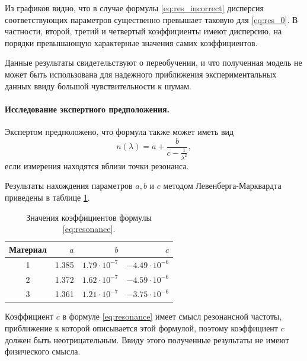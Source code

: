 \documentclass[12pt,a4paper]{article}
\theoremstyle{definition}
\begin{document}
Из графиков видно, что в случае формулы \eqref{eq:res_incorrect} дисперсия соответствующих
параметров существенно превышает таковую для \eqref{eq:res_0}. В частности, второй, третий
и четвертый коэффициенты имеют дисперсию, на порядки превышающую характерные значения самих
коэффициентов.

Данные результаты свидетельствуют о переобучении, и что полученная модель не может быть
использована для надежного приближения экспериментальных данных ввиду большой чувствительности
к шумам.

\paragraph{Исследование экспертного предположения.}

Экспертом предположено, что формула также может иметь вид
\begin{equation}
  n(\lambda) = a + \frac{b}{c - \frac{1}{\lambda^2}},
  \label{eq:resonance}
\end{equation}
если измерения находятся вблизи точки резонанса.

Результаты нахождения параметров $a, b$ и $c$ методом Левенберга-Марквардта
приведены в таблице \ref{tabl:resonance_coeffs}.

\begin{table}[h]
  \centering
  \begin{tabular}{| c | r | r | r |} \hline
	Материал	& $a$		& $b$					& $c$					\\ \hline
	1			& 1.385		& $1.79 \cdot 10^{-7}$	& $-4.49 \cdot 10^{-6}$	\\ \hline
	2			& 1.372		& $1.62 \cdot 10^{-7}$	& $-4.59 \cdot 10^{-6}$	\\ \hline
	3			& 1.361		& $1.21 \cdot 10^{-7}$	& $-3.75 \cdot 10^{-6}$	\\ \hline
  \end{tabular}
  \caption{Значения коэффициентов формулы \eqref{eq:resonance}.}
  \label{tabl:resonance_coeffs}
\end{table}

Коэффициент $c$ в формуле \eqref{eq:resonance} имеет смысл резонансной
частоты, приближение к которой описывается этой формулой, поэтому коэффициент
$c$ должен быть неотрицательным. Ввиду этого полученные результаты не
имеют физического смысла.
\end{document}
